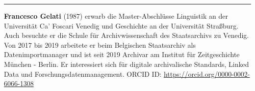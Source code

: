 \begin{center}\rule{0.5\linewidth}{0.5pt}\end{center}

\textbf{Francesco Gelati} (1987) erwarb die Master-Abschlüsse Linguistik
an der Universität Ca' Foscari Venedig und Geschichte an der Universität
Straßburg. Auch besuchte er die Schule für Archivwissenschaft des
Staatsarchivs zu Venedig. Von 2017 bis 2019 arbeitete er beim Belgischen
Staatsarchiv als Datenimportmanager und ist seit 2019 Archivar am
Institut für Zeitgeschichte München - Berlin. Er interessiert sich für
digitale archivalische Standards, Linked Data und
Forschungsdatenmanagement. ORCID ID:
\url{https://orcid.org/0000-0002-6066-1308}

